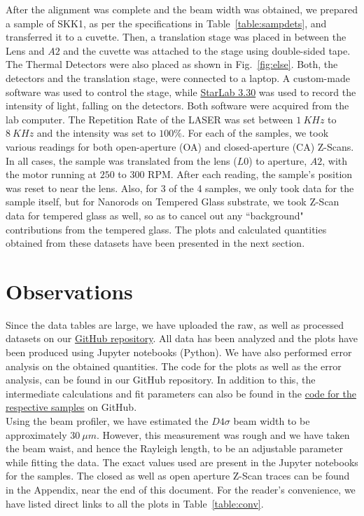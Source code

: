 \documentclass[%
 reprint,
amsmath,
amssymb,
10pt
]{revtex4-2}
\begin{document}
After the alignment was complete and the beam width was obtained, we prepared a sample of SKK1, as per the specifications in Table~\ref{table:sampdets}, and transferred it to a cuvette. Then, a translation stage was placed in between the Lens and $A2$ and the cuvette was attached to the stage using double-sided tape. The Thermal Detectors were also placed as shown in Fig.~\ref{fig:else}. Both, the detectors and the translation stage, were connected to a laptop. A custom-made software was used to control the stage, while \href{https://www.ophiropt.com/laser--measurement/node/11344}{StarLab 3.30} was used to record the intensity of light, falling on the detectors. Both software were acquired from the lab computer. The Repetition Rate of the LASER was set between $1\:KHz$ to $8\:KHz$ and the intensity was set to $100\%$. For each of the samples, we took various readings for both open-aperture (OA) and closed-aperture (CA) Z-Scans. In all cases, the sample was translated from the lens ($L0$) to aperture, $A2$, with the motor running at $250$ to $300$ RPM. After each reading, the sample's position was reset to near the lens. Also, for 3 of the 4 samples, we only took data for the sample itself, but for Nanorods on Tempered Glass substrate, we took Z-Scan data for tempered glass as well, so as to cancel out any ``background" contributions from the tempered glass. The plots and calculated quantities obtained from these datasets have been presented in the next section.

\section{\label{obs}Observations}
Since the data tables are large, we have uploaded the raw, as well as processed datasets on our \href{https://github.com/JeS24/z_scan}{GitHub repository}. All data has been analyzed and the plots have been produced using Jupyter notebooks (Python). We have also performed error analysis on the obtained quantities. The code for the plots as well as the error analysis, can be found in our GitHub repository. In addition to this, the intermediate calculations and fit parameters can also be found in the \href{https://github.com/JeS24/z_scan/blob/main/notebooks}{code for the respective samples} on GitHub.\\

Using the beam profiler, we have estimated the $D4\sigma$ beam width \cite{d4s} to be approximately $30\:\mu m$. However, this measurement was rough and we have taken the beam waist, and hence the Rayleigh length, to be an adjustable parameter while fitting the data. The exact values used are present in the Jupyter notebooks for the samples. The closed as well as open aperture Z-Scan traces can be found in the Appendix, near the end of this document. For the reader's convenience, we have listed direct links to all the plots in Table~\ref{table:conv}.\\
\end{document}
